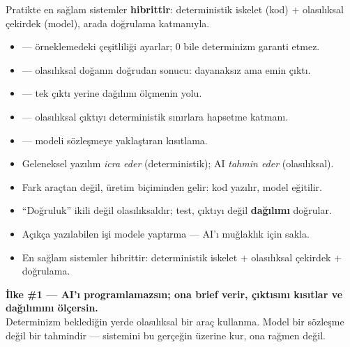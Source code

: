 \vspace{4pt}
Pratikte en sağlam sistemler \textbf{hibrittir}: deterministik iskelet (kod) +
olasılıksal çekirdek (model), arada doğrulama katmanıyla.

\begin{itemize}
  \item {} --- örneklemedeki çeşitliliği ayarlar; 0 bile determinizm garanti etmez.
  \item {} --- olasılıksal doğanın doğrudan sonucu: dayanaksız ama emin çıktı.
  \item {} --- tek çıktı yerine dağılımı ölçmenin yolu.
  \item {} --- olasılıksal çıktıyı deterministik sınırlara hapsetme katmanı.
  \item {} --- modeli sözleşmeye yaklaştıran kısıtlama.
\end{itemize}

\begin{itemize}
  \item Geleneksel yazılım \emph{icra eder} (deterministik); AI \emph{tahmin eder} (olasılıksal).
  \item Fark araçtan değil, üretim biçiminden gelir: kod yazılır, model eğitilir.
  \item ``Doğruluk'' ikili değil olasılıksaldır; test, çıktıyı değil \textbf{dağılımı} doğrular.
  \item Açıkça yazılabilen işi modele yaptırma --- AI'ı muğlaklık için sakla.
  \item En sağlam sistemler hibrittir: deterministik iskelet + olasılıksal çekirdek + doğrulama.
\end{itemize}

\begin{principlebox}
\textbf{İlke \#1 — AI'ı programlamazsın; ona brief verir, çıktısını kısıtlar ve dağılımını ölçersin.}\\[4pt]
\normalsize Determinizm beklediğin yerde olasılıksal bir araç kullanma. Model
bir sözleşme değil bir tahmindir --- sistemini bu gerçeğin üzerine kur, ona rağmen değil.
\end{principlebox}
